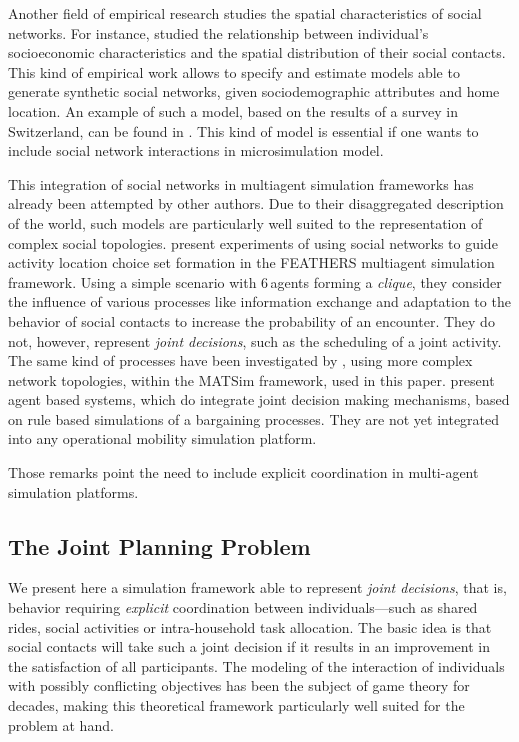 {Another field of empirical research studies the spatial characteristics of social networks. For instance, \citet{CarrascoJAEtAl_TRR_2008} studied the relationship between individual's socioeconomic
characteristics and the spatial distribution of their social contacts. This kind of empirical work allows to specify and estimate models able to generate synthetic social networks, given sociodemographic attributes and home location. An example of such a model, based on the results of a survey in Switzerland, can be found in \citet{ArentzeEtAl_TRB_2012}. This kind of model is essential if one wants to include social network interactions in microsimulation model.

This integration of social networks in multiagent simulation frameworks has already been attempted by other authors. Due to their disaggregated description of the world, such models are particularly well suited to the representation of complex social topologies. \citet{HanQEtAl_TransResPartA_2011} present experiments of using social networks to guide activity location choice set formation in the FEATHERS multiagent simulation framework. Using a simple scenario with 6\,agents forming a \emph{clique}, %
they consider the influence of various processes like information exchange and adaptation to the behavior of social contacts to increase the probability of an encounter. They do not, however, represent \emph{joint decisions}, such as the scheduling of a joint activity. The same kind of processes have been investigated by \citet{Hackney_PhDThesis_2009}, using more complex network topologies, within the MATSim framework, used in this paper. \citet{RonaldEtAl_TransResB_2012, MaEtAl_TRR_2011,MaEtAl_IATBR_2012} present agent based systems, which do integrate joint decision making mechanisms, based on rule based simulations of a bargaining processes. They are not yet integrated into any operational mobility simulation platform.

Those remarks point the need to include explicit coordination in multi-agent simulation platforms.

\subsection{The Joint Planning Problem}
We present here a simulation framework able to represent \emph{joint decisions}, that is, behavior requiring \emph{explicit} coordination between individuals---such as shared rides, social activities or intra-household task allocation. The basic idea is that social contacts will take such a joint decision if it results in an improvement in the satisfaction of all participants. The modeling of the interaction of individuals with possibly conflicting objectives has been the subject of game theory for decades, making this theoretical framework particularly well suited for the problem at hand.

}
